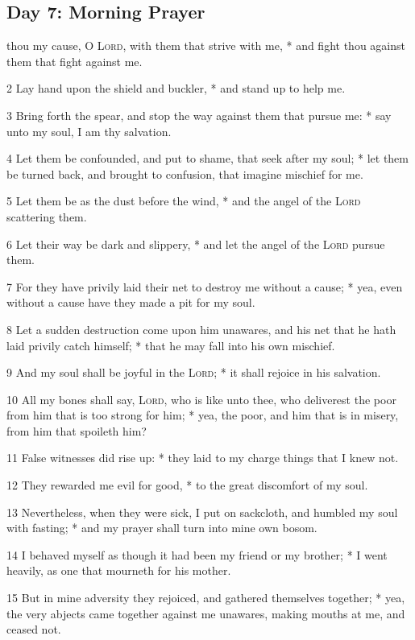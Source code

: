 \subsection{Day 7: Morning Prayer}
 thou my cause, O {\textsc{Lord}}, with them that strive with me, * and fight thou against them that fight against me.\par
2 Lay hand upon the shield and buckler, * and stand up to help me.\par
3 Bring forth the spear, and stop the way against them that pursue me: * say unto my soul, I am thy salvation.\par
4 Let them be confounded, and put to shame, that seek after my soul; * let them be turned back, and brought to confusion, that imagine mischief for me.\par
5 Let them be as the dust before the wind, * and the angel of the {\textsc{Lord}} scattering them.\par
6 Let their way be dark and slippery, * and let the angel of the {\textsc{Lord}} pursue them.\par
7 For they have privily laid their net to destroy me without a cause; * yea, even without a cause have they made a pit for my soul.\par
8 Let a sudden destruction come upon him unawares, and his net that he hath laid privily catch himself; * that he may fall into his own mischief.\par
9 And my soul shall be joyful in the {\textsc{Lord}}; * it shall rejoice in his salvation.\par
10 All my bones shall say, {\textsc{Lord}}, who is like unto thee, who deliverest the poor from him that is too strong for him; * yea, the poor, and him that is in misery, from him that spoileth him?\par
11 False witnesses did rise up: * they laid to my charge things that I knew not.\par
12 They rewarded me evil for good, * to the great discomfort of my soul.\par
13 Nevertheless, when they were sick, I put on sackcloth, and humbled my soul with fasting; * and my prayer shall turn into mine own bosom.\par
14 I behaved myself as though it had been my friend or my brother; * I went heavily, as one that mourneth for his mother.\par
15 But in mine adversity they rejoiced, and gathered themselves together; * yea, the very abjects came together against me unawares, making mouths at me, and ceased not.\par
